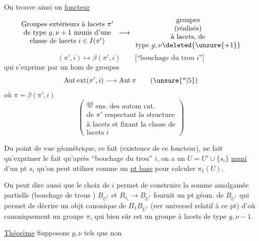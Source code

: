 On trouve ainsi un \uline{foncteur}
\[
\begin{array}{c}
\text{Groupes extérieurs à lacets }\pi'\\
\text{de type }g,\nu+1\text{ munis d'une}\\
\text{classe de lacets }i\in I(\pi')
\end{array}
\longrightarrow
\begin{array}{c}
\text{groupes}\\
\text{(réalisés)}\\
\text{à lacets, de}\\
\text{type }g,\nu\deleted{\unsure{+1}}
\end{array}
\]
\[
(\pi',i)\longmapsto\beta(\pi',i)
\qquad
\text{[``bouchage du trou \(i\)'']}
\]
qui s'exprime par un hom de groupes
\[
\operatorname{Aut\,ext}(\pi',i)\longrightarrow\operatorname{Aut}\pi
\tag{\unsure{*|5}}
\]
où \(\pi=\beta(\pi',i)\)
\[
\left(
\begin{array}{l}
\overset{\text{déf}}{=}\text{ ens. des autom cat.}\\
\text{de }\pi'\text{ respectant la structure}\\
\text{à lacets et fixant la classe de}\\
\text{lacets }i
\end{array}
\right)
\]

Du point de vue géométrique, ce fait (existence de ce foncteur), ne fait qu'exprimer le fait qu'après ``bouchage du trou'' \(i\), on a un  \(U=U'\cup\{s_i\}\) \uline{muni} d'un pt \(s_i\) qu'on peut utiliser comme un \uline{pt base}  pour calculer \(\pi_1(U)\).

On peut dire aussi que le choix de \(i\) permet de construire la somme amalgamée partielle (bouchage de trous ) \(B_{U^*}\)
et \(B_{s_i}\longrightarrow B_{U^*}\) fournit un pt géom. de \(B_{U^*}\) qui permet de décrire un objt canonique de \(\Pi_1B_{U^*}\) (rev universel relatif à ce pt) d'où canoniquement un groupe \(\pi\), qui bien sûr est un groupe à lacets de type \(g,\nu-1\).

\uline{Théorème} Supposons \(g,\nu\) tels que non


